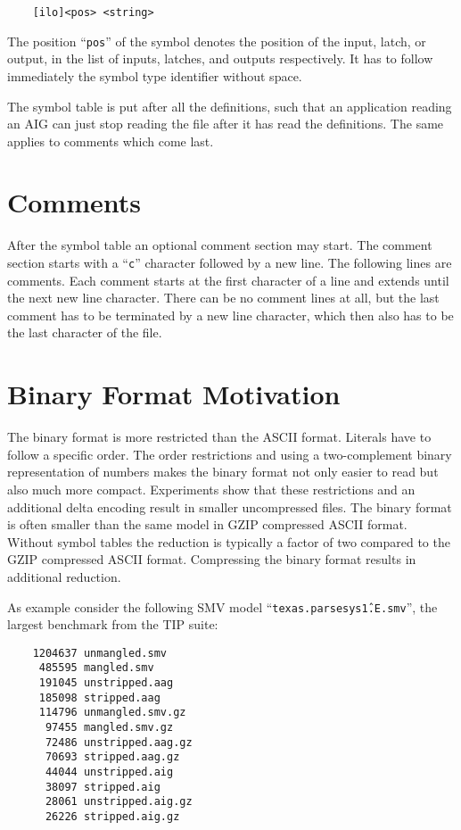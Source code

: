 \documentclass{llncs}
\begin{document}
\begin{verbatim}
    [ilo]<pos> <string>
\end{verbatim}
  
  The position ``\texttt{pos}'' of the symbol denotes the position of the input, latch,
  or output, in the list of inputs, latches, and outputs respectively.  It
  has to follow immediately the symbol type identifier without space.

  The symbol table is put after all the definitions, such that an
  application reading an AIG can just stop reading the file after it has
  read the definitions.  The same applies to comments which come last.

\section{Comments}
 
  After the symbol table an optional comment section may start.  The comment
  section starts with a ``\texttt{c}'' character followed by a new line.  The following
  lines are comments.  Each comment starts at the first character of a line
  and extends until the next new line character.  There can be no comment
  lines at all, but the last comment has to be terminated by a new line
  character, which then also has to be the last character of the file.

\section{Binary Format Motivation}

  The binary format is more restricted than the ASCII format.  Literals have
  to follow a specific order.  The order restrictions and using a
  two-complement binary representation of numbers makes the binary format
  not only easier to read but also much more compact.  Experiments show that
  these restrictions and an additional delta encoding result in smaller
  uncompressed files.  The binary format is often smaller than the same
  model in GZIP compressed ASCII format.  Without symbol tables the
  reduction is typically a factor of two compared to the GZIP compressed
  ASCII format.  Compressing the binary format results in additional
  reduction.  
  
  As example consider the following SMV model ``\texttt{texas.parsesys\^1.E.smv}'', the
  largest benchmark from the TIP suite:  

\begin{verbatim}
    1204637 unmangled.smv
     485595 mangled.smv
     191045 unstripped.aag
     185098 stripped.aag
     114796 unmangled.smv.gz
      97455 mangled.smv.gz
      72486 unstripped.aag.gz
      70693 stripped.aag.gz
      44044 unstripped.aig
      38097 stripped.aig
      28061 unstripped.aig.gz
      26226 stripped.aig.gz
\end{verbatim}
\end{document}

